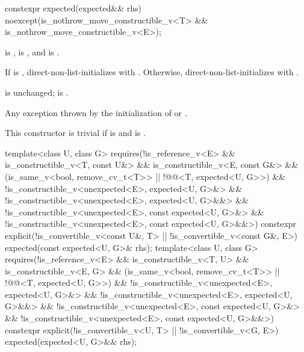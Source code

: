 %
\begin{itemdecl}
constexpr expected(expected&& rhs) noexcept(is_nothrow_move_constructible_v<T> &&
                                            is_nothrow_move_constructible_v<E>);
\end{itemdecl}

\begin{itemdescr}
\pnum
\constraints
{} is ,  is , and  is .

\pnum
\effects
If  is , direct-non-list-initializes  with . Otherwise, direct-non-list-initializes  with .

\pnum
\ensures
{} is unchanged;  is .

\pnum
\throws
Any exception thrown by the initialization of  or .

\pnum
\remarks
This constructor is trivial if  is  and  is .
\end{itemdescr}

%
\begin{itemdecl}
template<class U, class G>
  requires(!is_reference_v<E> && is_constructible_v<T, const U&> &&
           is_constructible_v<E, const G&> &&
           (is_same_v<bool, remove_cv_t<T>> ||
            !@@<T, expected<U, G>>) &&
           !is_constructible_v<unexpected<E>, expected<U, G>&> &&
           !is_constructible_v<unexpected<E>, expected<U, G>&&> &&
           !is_constructible_v<unexpected<E>, const expected<U, G>&> &&
           !is_constructible_v<unexpected<E>, const expected<U, G>&&>)
constexpr explicit(!is_convertible_v<const U&, T> || !is_convertible_v<const G&, E>)
    expected(const expected<U, G>& rhs);
template<class U, class G>
  requires(!is_reference_v<E> && is_constructible_v<T, U> && is_constructible_v<E, G> &&
           (is_same_v<bool, remove_cv_t<T>> ||
            !@@<T, expected<U, G>>) &&
           !is_constructible_v<unexpected<E>, expected<U, G>&> &&
           !is_constructible_v<unexpected<E>, expected<U, G>&&> &&
           !is_constructible_v<unexpected<E>, const expected<U, G>&> &&
           !is_constructible_v<unexpected<E>, const expected<U, G>&&>)
constexpr explicit(!is_convertible_v<U, T> || !is_convertible_v<G, E>)
    expected(expected<U, G>&& rhs);
\end{itemdecl}

